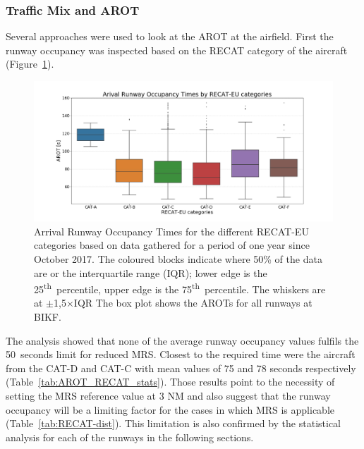 \subsubsection{Traffic Mix and AROT\label{sssec:mix_effect_arot}}
Several approaches were used to look at the AROT at the airfield. First the runway occupancy was inspected based on the RECAT category of the aircraft (Figure~\ref{fig:RECAT_AROTs_boxplot}). 
\begin{figure}[h]
    \centering
    \includegraphics[width=1\textwidth]{graphics/fig_RECAT_AROTs_boxplot.png}
    \caption[AROTs box-plot for RECAT categories, all runways]{Arrival Runway Occupancy Times for the different RECAT-EU categories based on data gathered for a period of one year since October 2017. The coloured blocks indicate where 50\% of the data are or the interquartile range (IQR); lower edge is the 25\textsuperscript{th}~percentile, upper edge is the 75\textsuperscript{th}~percentile. The whiskers are at $\pm$1,5$\times$IQR  The box plot shows the AROTs for all runways at BIKF.}
    \label{fig:RECAT_AROTs_boxplot}
\end{figure}
The analysis showed that none of the average runway occupancy values fulfils the 50~seconds limit for reduced MRS. Closest to the required time were the aircraft from the CAT-D and CAT-C with mean values of 75 and 78 seconds respectively (Table~\ref{tab:AROT_RECAT_stats}). Those results point to the necessity of setting the MRS reference value at 3 NM and also suggest that the runway occupancy will be a limiting factor for the cases in which MRS is applicable (Table~\ref{tab:RECAT-dist}). This limitation is also confirmed by the statistical analysis for each of the runways in the following sections.%

